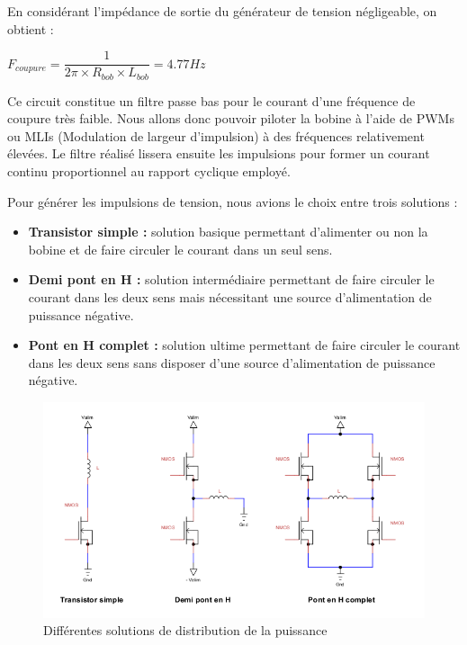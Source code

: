 \documentclass[11pt, french]{article} %
\begin{document}
\medskip
En considérant l'impédance de sortie du générateur de tension négligeable, on obtient :

$ F_{coupure} = \dfrac{1}{2\pi \times R_{bob} \times L_{bob}} = 4.77 Hz $

\medskip
Ce circuit constitue un filtre passe bas pour le courant d'une fréquence de coupure très faible. Nous allons donc pouvoir piloter la bobine à l'aide de PWMs ou MLIs (Modulation de largeur d'impulsion) à des fréquences relativement élevées. Le filtre réalisé lissera ensuite les impulsions pour former un courant continu proportionnel au rapport cyclique employé.

\medskip
\noindent
Pour générer les impulsions de tension, nous avions le choix entre trois solutions :

\medskip
\begin{itemize}
	\item \textbf{Transistor simple :} solution basique permettant d'alimenter ou non la bobine et de faire circuler le courant dans un seul sens.
	\item \textbf{Demi pont en H :} solution intermédiaire permettant de faire circuler le courant dans les deux sens mais nécessitant une source d'alimentation de puissance négative.
	\item \textbf{Pont en H complet :} solution ultime permettant de faire circuler le courant dans les deux sens sans disposer d'une source d'alimentation de puissance négative.
\end{itemize}

\begin{figure}[h!]
\centering
\includegraphics[width = 15cm]{SolutionAnalogique/Ponts.png} 
\caption{Différentes solutions de distribution de la puissance}
\end{figure}
\end{document}
